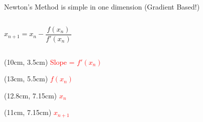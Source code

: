 \documentclass[aspectratio=169, usenames,dvipsnames, 14pt]{beamer}
\begin{document}
\begin{frame}{\small Newton’s Method is simple in one dimension (Gradient Based!)}
    \begin{columns}
            \begin{equation}
                x_{n+1} = x_{n} - \frac{f(x_{n})}{f'(x_{n})}                    %
            \end{equation}

        
    \end{columns}
    
    \begin{textblock*}{3cm}(10cm, 3.5cm)
        \small \textcolor{red}{Slope = $f'(x_{n})$}
    \end{textblock*}
    
    \begin{textblock*}{3cm}(13cm, 5.5cm)
        \small \textcolor{red}{$f(x_{n})$}
    \end{textblock*}
    
    \begin{textblock*}{3cm}(12.8cm, 7.15cm)
        \small \textcolor{red}{$x_{n}$}
    \end{textblock*}
    
    \begin{textblock*}{3cm}(11cm, 7.15cm)
        \small \textcolor{red}{$x_{n+1}$}
    \end{textblock*}
\end{frame}

\end{document}
